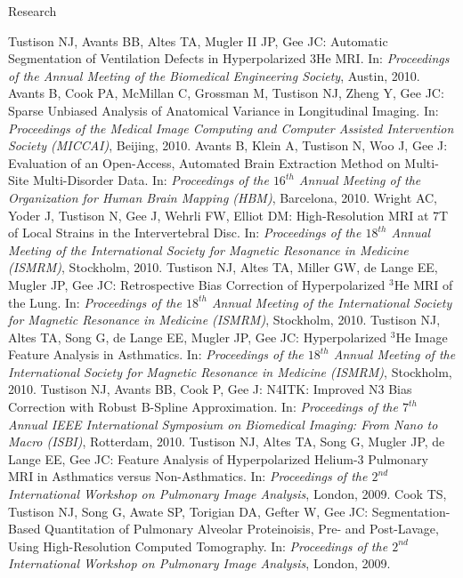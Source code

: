 \documentclass{resume}
\begin{document}
\begin{category}{Research}
\begin{itemize}
    \citemnobullet Tustison NJ, Avants BB, Altes TA, Mugler II JP, Gee JC:  Automatic Segmentation of Ventilation Defects in Hyperpolarized 3He MRI.  In:  {\em Proceedings of the Annual Meeting of the Biomedical Engineering Society}, Austin, 2010.
    \citemnobullet Avants B, Cook PA, McMillan C, Grossman M, Tustison NJ, Zheng Y, Gee JC:  Sparse Unbiased Analysis of Anatomical Variance in Longitudinal Imaging.  In: {\em Proceedings of the Medical Image Computing and Computer Assisted Intervention Society (MICCAI)}, Beijing, 2010.
    \citemnobullet Avants B, Klein A, Tustison N, Woo J, Gee J:  Evaluation of an Open-Access, Automated Brain Extraction Method on Multi-Site Multi-Disorder Data. In:  {\em Proceedings of the $16^{th}$ Annual Meeting of the Organization for Human Brain Mapping (HBM)}, Barcelona, 2010.   
    \citemnobullet Wright AC, Yoder J, Tustison N, Gee J, Wehrli FW, Elliot DM:  High-Resolution MRI at 7T of Local Strains in the Intervertebral Disc. In:  {\em Proceedings of the $18^{th}$ Annual Meeting of the International Society for Magnetic Resonance in Medicine (ISMRM)}, Stockholm, 2010.   
    \citemnobullet Tustison NJ, Altes TA, Miller GW, de Lange EE, Mugler JP, Gee JC: Retrospective Bias Correction of Hyperpolarized $^3$He MRI of the Lung. In:  {\em Proceedings of the $18^{th}$ Annual Meeting of the International Society for Magnetic Resonance in Medicine (ISMRM)}, Stockholm, 2010.   
    \citemnobullet Tustison NJ, Altes TA, Song G, de Lange EE, Mugler JP, Gee JC: Hyperpolarized $^3$He Image Feature Analysis in Asthmatics. In:  {\em Proceedings of the $18^{th}$ Annual Meeting of the International Society for Magnetic Resonance in Medicine (ISMRM)}, Stockholm, 2010.   
    \citemnobullet  Tustison NJ, Avants BB, Cook P, Gee J: N4ITK:  Improved N3 Bias Correction with Robust B-Spline Approximation. In:  {\em Proceedings of the $7^{th}$ Annual IEEE International Symposium on Biomedical Imaging: From Nano to Macro (ISBI)}, Rotterdam, 2010.
    \citemnobullet Tustison NJ, Altes TA, Song G, Mugler JP, de Lange EE, Gee JC: Feature Analysis of Hyperpolarized Helium-3 Pulmonary MRI in Asthmatics versus Non-Asthmatics. In: {\em Proceedings of the $2^{nd}$ International Workshop on Pulmonary Image Analysis}, London, 2009.
    \citemnobullet Cook TS, Tustison NJ, Song G, Awate SP, Torigian DA, Gefter W, Gee JC: Segmentation-Based Quantitation of Pulmonary Alveolar Proteinoisis, Pre- and Post-Lavage, Using High-Resolution Computed Tomography. In: {\em Proceedings of the $2^{nd}$ International Workshop on Pulmonary Image Analysis}, London, 2009.

\end{itemize}
\end{category}
\end{document}
